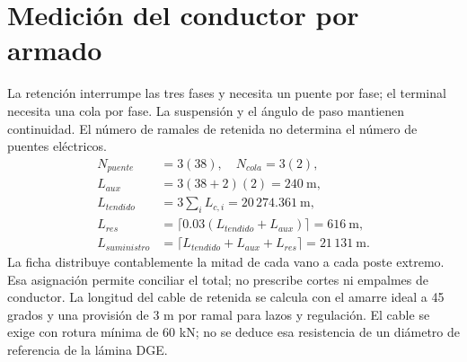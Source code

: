 \section{Medición del conductor por armado}
La retención interrumpe las tres fases y necesita un puente por fase; el terminal
necesita una cola por fase. La suspensión y el ángulo de paso mantienen continuidad.
El número de ramales de retenida no determina el número de puentes eléctricos.
\begin{align}
N_{puente}&=3(38),\quad N_{cola}=3(2),\\
L_{aux}&=3(38+2)(2)=240\ \mathrm{m},\\
L_{tendido}&=3\sum_i L_{c,i}=20\,274.361\ \mathrm{m},\\
L_{res}&=\lceil0.03(L_{tendido}+L_{aux})\rceil=616\ \mathrm{m},\\
L_{suministro}&=\lceil L_{tendido}+L_{aux}+L_{res}\rceil=\boxed{21\,131\ \mathrm{m}}.
\end{align}
La ficha distribuye contablemente la mitad de cada vano a cada poste extremo.
Esa asignación permite conciliar el total; no prescribe cortes ni empalmes de conductor.
La longitud del cable de retenida se calcula con el amarre ideal a 45 grados y una
provisión de 3 m por ramal para lazos y regulación. El cable se exige con rotura mínima
de 60 kN; no se deduce esa resistencia de un diámetro de referencia de la lámina DGE.

